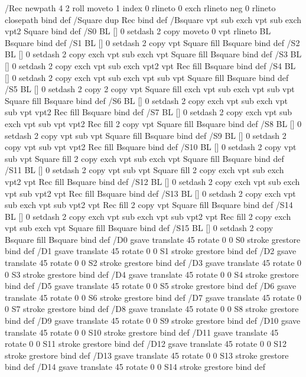 /Rec {newpath 4 2 roll moveto 1 index 0 rlineto 0 exch rlineto
	neg 0 rlineto closepath} bind def
/Square {dup Rec} bind def
/Bsquare {vpt sub exch vpt sub exch vpt2 Square} bind def
/S0 {BL [] 0 setdash 2 copy moveto 0 vpt rlineto BL Bsquare} bind def
/S1 {BL [] 0 setdash 2 copy vpt Square fill Bsquare} bind def
/S2 {BL [] 0 setdash 2 copy exch vpt sub exch vpt Square fill Bsquare} bind def
/S3 {BL [] 0 setdash 2 copy exch vpt sub exch vpt2 vpt Rec fill Bsquare} bind def
/S4 {BL [] 0 setdash 2 copy exch vpt sub exch vpt sub vpt Square fill Bsquare} bind def
/S5 {BL [] 0 setdash 2 copy 2 copy vpt Square fill
	exch vpt sub exch vpt sub vpt Square fill Bsquare} bind def
/S6 {BL [] 0 setdash 2 copy exch vpt sub exch vpt sub vpt vpt2 Rec fill Bsquare} bind def
/S7 {BL [] 0 setdash 2 copy exch vpt sub exch vpt sub vpt vpt2 Rec fill
	2 copy vpt Square fill Bsquare} bind def
/S8 {BL [] 0 setdash 2 copy vpt sub vpt Square fill Bsquare} bind def
/S9 {BL [] 0 setdash 2 copy vpt sub vpt vpt2 Rec fill Bsquare} bind def
/S10 {BL [] 0 setdash 2 copy vpt sub vpt Square fill 2 copy exch vpt sub exch vpt Square fill
	Bsquare} bind def
/S11 {BL [] 0 setdash 2 copy vpt sub vpt Square fill 2 copy exch vpt sub exch vpt2 vpt Rec fill
	Bsquare} bind def
/S12 {BL [] 0 setdash 2 copy exch vpt sub exch vpt sub vpt2 vpt Rec fill Bsquare} bind def
/S13 {BL [] 0 setdash 2 copy exch vpt sub exch vpt sub vpt2 vpt Rec fill
	2 copy vpt Square fill Bsquare} bind def
/S14 {BL [] 0 setdash 2 copy exch vpt sub exch vpt sub vpt2 vpt Rec fill
	2 copy exch vpt sub exch vpt Square fill Bsquare} bind def
/S15 {BL [] 0 setdash 2 copy Bsquare fill Bsquare} bind def
/D0 {gsave translate 45 rotate 0 0 S0 stroke grestore} bind def
/D1 {gsave translate 45 rotate 0 0 S1 stroke grestore} bind def
/D2 {gsave translate 45 rotate 0 0 S2 stroke grestore} bind def
/D3 {gsave translate 45 rotate 0 0 S3 stroke grestore} bind def
/D4 {gsave translate 45 rotate 0 0 S4 stroke grestore} bind def
/D5 {gsave translate 45 rotate 0 0 S5 stroke grestore} bind def
/D6 {gsave translate 45 rotate 0 0 S6 stroke grestore} bind def
/D7 {gsave translate 45 rotate 0 0 S7 stroke grestore} bind def
/D8 {gsave translate 45 rotate 0 0 S8 stroke grestore} bind def
/D9 {gsave translate 45 rotate 0 0 S9 stroke grestore} bind def
/D10 {gsave translate 45 rotate 0 0 S10 stroke grestore} bind def
/D11 {gsave translate 45 rotate 0 0 S11 stroke grestore} bind def
/D12 {gsave translate 45 rotate 0 0 S12 stroke grestore} bind def
/D13 {gsave translate 45 rotate 0 0 S13 stroke grestore} bind def
/D14 {gsave translate 45 rotate 0 0 S14 stroke grestore} bind def
